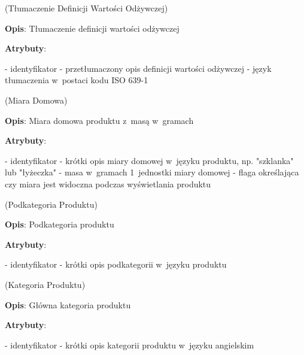 \begin{enumerate}[label={\textbf{KAT/\protect\threedigits{\theenumi}}}, wide, labelwidth=!, labelindent=0pt, labelsep=0pt, series=reqs]
    \label{kat:NutritionDefinitionTranslation} (Tłumaczenie Definicji Wartości Odżywczej)

    \textbf{Opis}: Tłumaczenie definicji wartości odżywczej
    \par
    \textbf{Atrybuty}:
    \begin{itemize}[series=atr, wide, align=left, leftmargin=190pt]
        \label{kat:NutritionDefinitionTranslation:id}- identyfikator
        \label{kat:NutritionDefinitionTranslation:translation}- przetłumaczony opis definicji wartości odżywczej
        \label{kat:NutritionDefinitionTranslation:language}- język tłumaczenia w~postaci kodu ISO 639-1
    \end{itemize}

    \label{kat:HouseholdMeasure} (Miara Domowa)

    \textbf{Opis}: Miara domowa produktu z~masą w~gramach
    \par
    \textbf{Atrybuty}:
    \begin{itemize}[series=atr, wide, align=left, leftmargin=190pt]
        \label{kat:HouseholdMeasure:id}- identyfikator
        \label{kat:HouseholdMeasure:description}- krótki opis miary domowej w~języku produktu, np. "szklanka" lub "łyżeczka"
        \label{kat:HouseholdMeasure:gramsWeight}- masa w~gramach 1~jednostki miary domowej
        \label{kat:HouseholdMeasure:isVisible}- flaga określająca czy miara jest widoczna podczas wyświetlania produktu
    \end{itemize}

    \label{kat:ProductSubcategory} (Podkategoria Produktu)

    \textbf{Opis}: Podkategoria produktu
    \par
    \textbf{Atrybuty}:
    \begin{itemize}[series=atr, wide, align=left, leftmargin=190pt]
        \label{kat:ProductSubcategory:id}- identyfikator
        \label{kat:ProductSubcategory:description}- krótki opis podkategorii w~języku produktu
    \end{itemize}

    \label{kat:ProductCategory} (Kategoria Produktu)

    \textbf{Opis}: Główna kategoria produktu
    \par
    \textbf{Atrybuty}:
    \begin{itemize}[series=atr, wide, align=left, leftmargin=190pt]
        \label{kat:ProductCategory:id}- identyfikator
        \label{kat:ProductCategory:description}- krótki opis kategorii produktu w~języku angielskim
    \end{itemize}


\end{enumerate}
